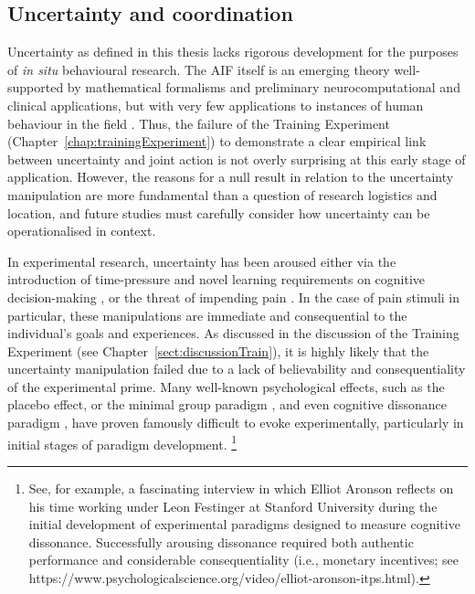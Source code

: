\subsection{Uncertainty and coordination}
Uncertainty as defined in this thesis lacks rigorous development for the purposes of \textit{in situ} behavioural research.  The AIF itself is an emerging theory well-supported by mathematical formalisms and preliminary neurocomputational and clinical applications, but with very few applications to instances of human behaviour in the field \citep{Clark2013}.  Thus, the failure of the Training Experiment (Chapter~\ref{chap:trainingExperiment}) to demonstrate a clear empirical link between uncertainty and joint action is not overly surprising at this early stage of application.  However, the reasons for a null result in relation to the uncertainty manipulation are more fundamental than a question of research logistics and location, and future studies must carefully consider how uncertainty can be operationalised in context.

In experimental research, uncertainty has been aroused either via the introduction of time-pressure and novel learning requirements on cognitive decision-making \citep[see:][]{Daw2005,Kording2006}, or the threat of impending pain \citep[e.g.,][]{Voigt1990,Moutoussis2014}.  In the case of pain stimuli in particular, these manipulations are immediate and consequential to the individual's goals and experiences.  As discussed in the discussion of the Training Experiment (see Chapter~\ref{sect:discussionTrain}), it is highly likely that the uncertainty manipulation failed due to a lack of believability and consequentiality of the experimental prime.  Many well-known psychological effects, such as the placebo effect, or the minimal group paradigm \citep[586]{Liu2009}, and even cognitive dissonance paradigm \citep{Kenworthy2011}, have proven famously difficult to evoke experimentally, particularly in initial stages of paradigm development. \footnote{See, for example, a fascinating interview in which Elliot Aronson reflects on his time working under Leon Festinger at Stanford University during the initial development of experimental paradigms designed to measure cognitive dissonance.  Successfully arousing dissonance required both authentic performance and considerable consequentiality (i.e., monetary incentives; see https://www.psychologicalscience.org/video/elliot-aronson-itps.html).}

